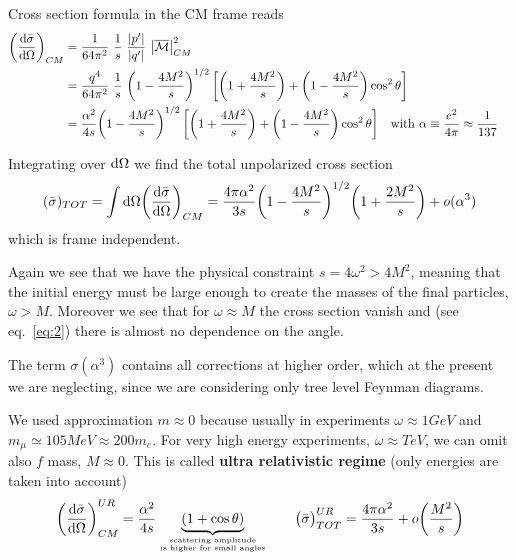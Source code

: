 \documentclass[TheoreticalPhy_ModB.tex]{subfiles}
\begin{document}
Cross section formula in the CM frame reads
\begin{align}
\biggl( \frac{\textup{d} \bar{\sigma}}{\textup{d} \Omega} \biggr)_{CM}
	& = \frac{1}{64\pi^2} \ \frac{1}{s} \ \frac{\abs{p'}}{\abs{q'}} \ \abs{\overline{\mathcal{M}}}^2_{CM} \notag \\
	& = \frac{q^4}{64 \pi^2} \ \frac{1}{s} \ \biggl( 1 - \frac{4M^2}{s} \biggr)^{1/2} \, 
		\biggl[ \biggl( 1 + \frac{4M^2}{s} \biggr) + \biggl( 1 - \frac{4M^2}{s} \biggr) \cos^2 \theta \biggr] \notag \\
	& = \frac{\alpha^2}{4s} \biggl( 1 - \frac{4M^2}{s} \biggr)^{1/2} \,
		\biggl[ \biggl( 1 + \frac{4M^2}{s} \biggr) + \biggl( 1 - \frac{4M^2}{s} \biggr) \cos^2 \theta \biggr]
		\quad \textup{with } \alpha \equiv \frac{e^2}{4 \pi} \approx \frac{1}{137}	
		\label{eq:2}&
\end{align}

Integrating over $\textup{d} \Omega$ we find the total unpolarized cross section
\begin{equation}
(\bar{\sigma})_{TOT} = \int \textup{d} \Omega \biggl( \frac{\textup{d} \bar{\sigma}}{\textup{d} \Omega} \biggr)_{CM}
= \frac{4 \pi \alpha^2}{3s} \biggl( 1 - \frac{4M^2}{s} \biggr)^{1/2} \biggl( 1 + \frac{2M^2}{s} \biggr) + o(\alpha^3)
\label{eq:3}
\end{equation}
which is frame independent.

Again we see that we have the physical constraint $s=4\omega^2>4M^2$, meaning that the initial energy must be large enough to create the masses of the final particles, $\omega>M$. 
Moreover we see that for $\omega \approx M$ the cross section vanish and (see eq.~\eqref{eq:2}) there is almost no dependence on the angle.

The term $\sigma(\alpha^3)$ contains all corrections at higher order, which at the present we are neglecting, since we are considering only tree level Feynman diagrams. 

We used approximation $m \approx 0$ because usually in experiments $\omega \approx 1 GeV$ and $m_{\mu}  \simeq 105 MeV \approx 200 m_e$. For very high energy experiments, $\omega \approx TeV$, we can omit also $f$ mass, $M \approx 0$. This is called \textbf{ultra relativistic regime} (only energies are taken into account)
\begin{equation}\label{eqn:electr-muon-scatt-QED-UR}
\biggl( \frac{\textup{d} \bar{\sigma}}{\textup{d} \Omega} \biggr)_{CM}^{UR} =
	\frac{\alpha^2}{4s} \underbrace{(1 + \cos \theta)}_{\text{scattering amplitude} \atop \text{is higher for small angles}}
\qquad
\bigl( \bar{\sigma} \bigr)^{UR}_{TOT} = \frac{4 \pi \alpha^2}{3s} + o \biggl( \frac{M^2}{s} \biggr)
\end{equation}
\end{document}
